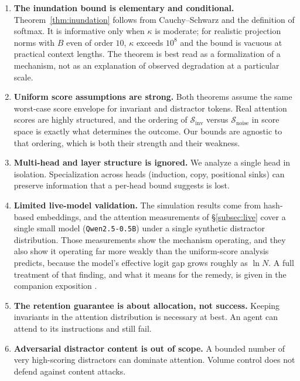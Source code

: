 ﻿\documentclass[11pt,a4paper]{article}
\theoremstyle{plain}
\theoremstyle{definition}
\theoremstyle{remark}
\begin{document}
\begin{enumerate}
  \item \textbf{The inundation bound is elementary and conditional.}
        Theorem~\ref{thm:inundation} follows from Cauchy--Schwarz and the
        definition of softmax. It is informative only when $\kappa$ is moderate;
        for realistic projection norms with $B$ even of order $10$, $\kappa$
        exceeds $10^{8}$ and the bound is vacuous at practical context lengths.
        The theorem is best read as a formalization of a mechanism, not as an
        explanation of observed degradation at a particular scale.

  \item \textbf{Uniform score assumptions are strong.} Both theorems assume the
        same worst-case score envelope for invariant and distractor tokens.
        Real attention scores are highly structured, and the ordering of
        $\mathcal{S}_{\mathrm{inv}}$ versus $\mathcal{S}_{\mathrm{noise}}$ in
        score space is exactly what determines the outcome. Our bounds are
        agnostic to that ordering, which is both their strength and their
        weakness.

  \item \textbf{Multi-head and layer structure is ignored.} We analyze a single
        head in isolation. Specialization across heads (induction, copy,
        positional sinks) can preserve information that a per-head bound
        suggests is lost.

  \item \textbf{Limited live-model validation.} The simulation results come from
        hash-based embeddings, and the attention measurements of
        \S\ref{subsec:live} cover a single small model
        (\texttt{Qwen2.5-0.5B}) under a single synthetic distractor
        distribution. Those measurements show the mechanism operating, and they
        also show it operating far more weakly than the uniform-score analysis
        predicts, because the model's effective logit gap grows roughly as
        $\ln N$. A full treatment of that finding, and what it means for the
        remedy, is given in the companion exposition
        \cite{sanyal2026fools}.

  \item \textbf{The retention guarantee is about allocation, not success.}
        Keeping invariants in the attention distribution is necessary at best.
        An agent can attend to its instructions and still fail.

  \item \textbf{Adversarial distractor content is out of scope.} A bounded
        number of very high-scoring distractors can dominate attention. Volume
        control does not defend against content attacks.
\end{enumerate}
\end{document}
